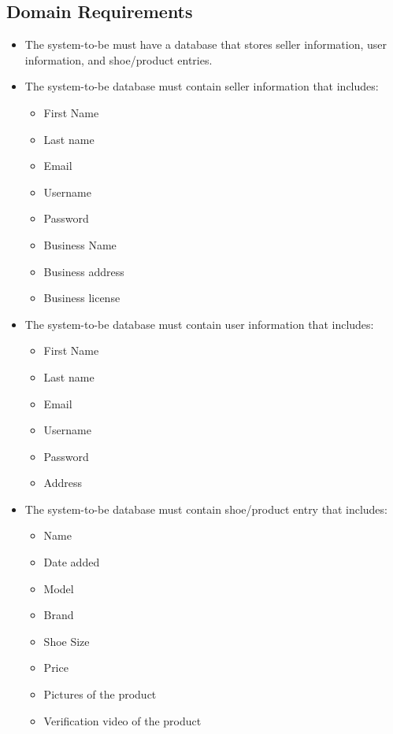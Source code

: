 \subsection{Domain Requirements}
\begin{itemize}
  \item The system-to-be must have a database that stores seller information, user information, and shoe/product entries.
  \item The system-to-be database must contain seller information that includes:
        \begin{itemize}
          \item First Name
          \item Last name
          \item Email
          \item Username
          \item Password
          \item Business Name
          \item Business address
          \item Business license
        \end{itemize}
  \item The system-to-be database must contain user information that includes:
        \begin{itemize}
          \item First Name
          \item Last name
          \item Email
          \item Username
          \item Password
          \item Address
        \end{itemize}
  \item The system-to-be database must contain shoe/product entry that includes:
        \begin{itemize}
          \item Name
          \item Date added
          \item Model
          \item Brand
          \item Shoe Size
          \item Price
          \item Pictures of the product
          \item Verification video of the product
        \end{itemize}

\end{itemize}
